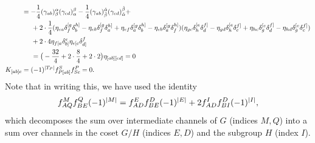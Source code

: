 \documentclass[12pt]{article}
\def\be{\begin{equation}}
\def\ee{\end{equation}}
\numberwithin{equation}{section}
\newcommand{\h}[1]{\hat{#1}}
\begin{document}
{\begin{align}
		     &= -\frac{1}{4} (\gamma_{ab})_\beta^\alpha (\gamma_{cd})_\alpha^\beta - \frac{1}{4}(\gamma_{ab})_{\h{\beta}}^{\h{\alpha}} (\gamma_{cd})_{\h{\alpha}}^{\h{\beta}} + \nonumber \\
		     &\hspace{0.5cm}+2\cdot\frac{1}{4}(\eta_{e a}\delta^{[g}_f \delta^{h]}_b - \eta_{e b}\delta^{[g}_f \delta^{h]}_a + \eta_{e f}\delta^{[g}_a \delta^{h]}_b  - \eta_{e b}\delta^{[g}_a \delta^{h]}_f)(\eta_{gc} \delta^{[e}_h \delta^{f]}_d - \eta_{gd} \delta^{[e}_h \delta^{f]}_c + \eta_{hc} \delta^{[e}_g \delta^{f]}_d - \eta_{hd} \delta^{[e}_g \delta^{f]}_c)  \nonumber \\
		     &\hspace{0.5cm}+ 2\cdot 4\eta_{f[a}\delta^e_{b]} \eta_{e[c}\delta^f_{d]}\nonumber \\
		     &\hspace{0.5cm} = \big(-\frac{32}{4} + 2\cdot \frac{8}{4} + 2\cdot 2\big)\eta_{[ab][cd]} = 0 \nonumber \\
	K_{[ab] c} &= (-1)^{\abs{T_P}} f^S_{P [ab]} f^P_{S c} = 0.
\end{align}
}
Note that in writing this, we have used the identity \cite{Berkovits:1999zq}
\be
f^M_{AQ}f^Q_{BE} (-1)^{\abs{M}} = f^E_{AD} f^D_{BE} (-1)^{\abs{E}} + 2 f^I_{AD}f^D_{BI}(-1)^{\abs{I}},
\ee
which decomposes the sum over intermediate channels of $G$ (indices $M, Q$) into a sum over channels in the coset $G/H$ (indices $E, D$) and the subgroup $H$ (index $I$).
\end{document}
